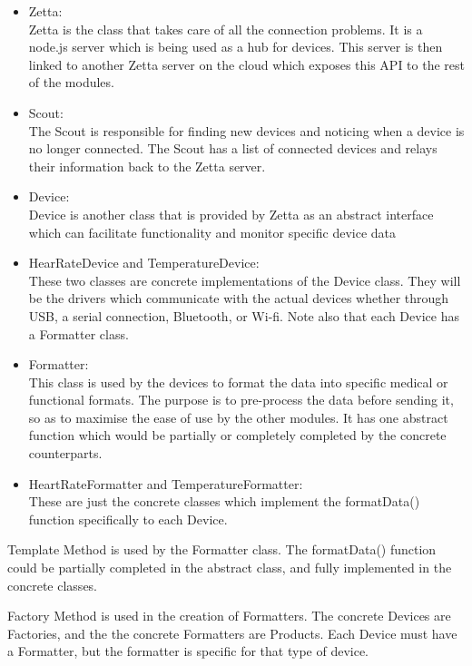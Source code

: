 \begin{itemize}
	\item Zetta:\\
	Zetta is the class that takes care of all the connection problems. It is a node.js server which is being used as a hub for devices. This server is then linked to another Zetta server on the cloud which exposes this API to the rest of the modules.

	\item Scout:\\
	The Scout is responsible for finding new devices and noticing when a device is no longer connected. The Scout has a list of connected devices and relays their information back to the Zetta server.

	\item Device:\\
	Device is another class that is provided by Zetta as an abstract interface which can facilitate functionality and monitor specific device data

	\item HearRateDevice and TemperatureDevice:\\
	These two classes are concrete implementations of the Device class. They will be the drivers which communicate with the actual devices whether through USB, a serial connection, Bluetooth, or Wi-fi. Note also that each Device has a Formatter class.

	\item Formatter:\\
	This class is used by the devices to format the data into specific medical or functional formats. The purpose is to pre-process the data before sending it, so as to maximise the ease of use by the other modules. It has one abstract function which would be partially or completely completed by the concrete counterparts.

	\item HeartRateFormatter and TemperatureFormatter:\\
	These are just the concrete classes which implement the formatData() function specifically to each Device.
\end{itemize}
Template Method is used by the Formatter class. The formatData() function could be partially completed in the abstract class, and fully implemented in the concrete classes.

Factory Method is used in the creation of Formatters. The concrete Devices are Factories, and the the concrete Formatters are Products. Each Device must have a Formatter, but the formatter is specific for that type of device.